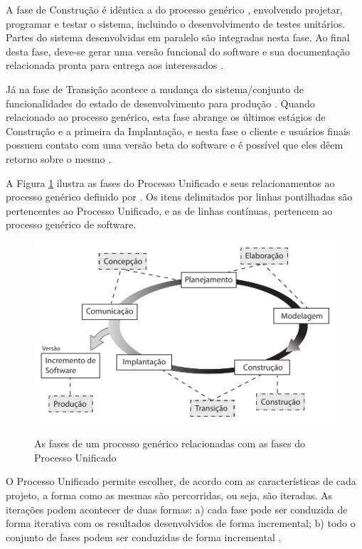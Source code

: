 A fase de Construção é idêntica a do processo genérico \cite{pressman06}, envolvendo projetar, programar e testar o sistema, incluindo o desenvolvimento de testes unitários. Partes do sistema desenvolvidas em paralelo são integradas nesta fase. Ao final desta fase, deve-se gerar uma versão funcional do software e sua documentação relacionada pronta para entrega aos interessados \cite{sommerville10}. 

Já na fase de Transição acontece a mudança do sistema/conjunto de funcionalidades do estado de desenvolvimento para produção \cite{sommerville10}. Quando relacionado ao processo genérico, esta fase abrange os últimos estágios de Construção e a primeira da Implantação, e nesta fase o cliente e usuários finais possuem contato com uma versão beta do software e é possível que eles dêem retorno sobre o mesmo  \cite{pressman06}.

A Figura \ref{fig:processo_unificado} ilustra as fases do Processo Unificado e seus relacionamentos ao processo genérico definido por . Os itens delimitados por linhas pontilhadas são pertencentes ao Processo Unificado, e as de linhas contínuas, pertencem ao processo genérico de software.

\begin{figure}[!h]
\centering
\caption{As fases de um processo genérico relacionadas com as fases do Processo Unificado}
\includegraphics{pdfs/img-processo-unificado.pdf}
\label{fig:processo_unificado} 
\end{figure}

O Processo Unificado permite escolher, de acordo com as características de cada projeto, a forma como as mesmas são percorridas, ou seja, são iteradas. As iterações podem acontecer de duas formas: a) cada fase pode ser conduzida de forma iterativa com os resultados desenvolvidos de forma incremental; b) todo o conjunto de fases podem ser conduzidas de forma incremental \cite{sommerville10}.

